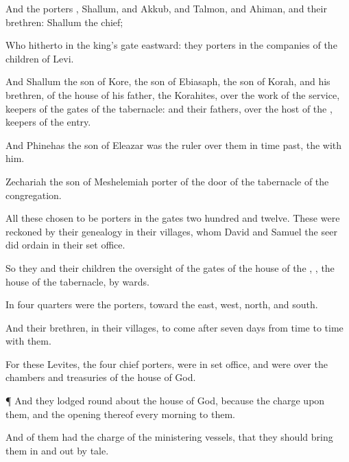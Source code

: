 {And the
porters
{},
Shallum, and
Akkub, and
Talmon, and
Ahiman, and their
brethren:
Shallum
{} the
chief;

Who hitherto
{} in the
king’s
gate
eastward: they
{}
porters in the
companies of the
children of
Levi.

And
Shallum the
son of
Kore, the
son of
Ebiasaph, the
son of
Korah, and his
brethren, of the
house of his
father, the
Korahites,
{} over the
work of the
service,
keepers of the
gates of the
tabernacle: and their
fathers,
{} over the
host of the
{},
{}
keepers of the
entry.

And
Phinehas the
son of
Eleazar was the
ruler over them in time
past,
{} the
{}
{} with him.

Zechariah the
son of
Meshelemiah
{}
porter of the
door of the
tabernacle of the
congregation.

All these
{}
chosen to be
porters in the
gates
{} two
hundred and
twelve. These were reckoned by their
genealogy in their
villages,
whom
David and
Samuel the
seer did
ordain in their set
office.

So they and their
children
{} the oversight of the
gates of the
house of the
{},
{}, the
house of the
tabernacle, by
wards.

In
four
quarters were the
porters, toward the
east,
west,
north, and
south.

And their
brethren,
{} in their
villages,
{} to
come after
seven
days from
time to
time with them.

For these
Levites, the
four
chief
porters, were in
{} set
office, and were over the
chambers and
treasuries of the
house of
God.


\par }{\PP {}¶ And they
lodged round
about the
house of
God, because the
charge
{} upon them, and the
opening thereof every
morning
{} to them.

And
{} of them had the charge
of the
ministering
vessels, that they should bring them
in and
out by
tale.

}
